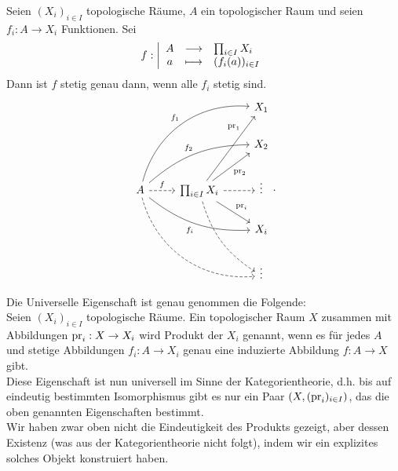 
\begin{theorem}\label{thm:universelle-eigenschaft-des-produkts}
    Seien $(X_i)_{i\in I}$ topologische Räume, $A$ ein topologischer Raum und seien $f_i : A \to  X_i$ Funktionen. Sei
        \begin{equation*}
        f: \left| \begin{array}{c c l} 
        A & \longrightarrow & \prod_{i \in I} X_i \\
        a & \longmapsto &  (f_i(a))_{i \in I}
        \end{array} \right.
    \end{equation*}
    Dann ist $f$ stetig genau dann, wenn alle  $f_i$ stetig sind.
    \[
    \begin{tikzcd}
        & & X_1 \\
        & & X_2 \\
    A \ar[dashed]{r}{f} \ar[bend left = 40]{uurr}{f_1} \ar[bend left = 20]{urr}{f_2} \ar[bend right = 20,swap]{drr}{f_i} \ar[dashed, bend right = 40]{ddrr}& \prod_{i \in I}X_i \ar[near end]{uru}{\pr_1} \ar[swap]{ur}{\pr_2} \ar{dr}{\pr_i} \ar[bend right = 20,dashed]{ddr} \ar[dashed]{r}& \vdots \\
          & & X_i \\
          & & \vdots
    \end{tikzcd}
    .\] 
\end{theorem}
\begin{remark*}
    Die Universelle Eigenschaft ist genau genommen die Folgende: \\
    Seien $(X_i)_{i \in I}$ topologische Räume. Ein topologischer Raum $X$  zusammen mit Abbildungen  $\operatorname{pr}_i : X \to  X_i$ wird Produkt der $X_i$ genannt, wenn es für jedes  $A$ und stetige Abbildungen  $f_i : A \to  X_i$ genau eine induzierte Abbildung $f: A \to  X$ gibt. \\
    Diese Eigenschaft ist nun universell im Sinne der Kategorientheorie, d.h. bis auf eindeutig bestimmten Isomorphismus gibt es nur ein Paar $(X, (\operatorname{pr}_i)_{i \in I})$, das die oben genannten Eigenschaften bestimmt. \\
    Wir haben zwar oben nicht die Eindeutigkeit des Produkts gezeigt, aber dessen Existenz (was aus der Kategorientheorie nicht folgt), indem wir ein explizites solches Objekt konstruiert haben.
\end{remark*}
